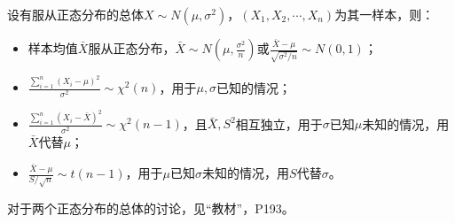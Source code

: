\begin{theorem}
设有服从正态分布的总体$X\sim N\left( \mu ,\sigma ^2 \right) $，$\left( X_1,X_2,\cdots ,X_n \right) $为其一样本，则：
\begin{itemize}
    \item 样本均值$\bar{X}$服从正态分布，$\bar{X}\sim N\left( \mu ,\frac{\sigma ^2}{n} \right) $或$\frac{\bar{X}-\mu}{\sqrt{\sigma ^2/n}}\sim N\left( 0,1 \right) $；
    \item $\frac{\sum_{i=1}^n{\left( X_i-\mu \right) ^2}}{\sigma ^2}\sim \chi ^2\left( n \right) $，用于$\mu ,\sigma $已知的情况；
    \item $\frac{\sum_{i=1}^n{\left( X_i-\bar{X} \right) ^2}}{\sigma ^2}\sim \chi ^2\left( n-1 \right) $，且$\bar{X},S^2$相互独立，用于$\sigma $已知$\mu $未知的情况，用$\bar{X}$代替$\mu $；
    \item $\frac{\bar{X}-\mu}{S/\sqrt{n}}\sim t\left( n-1 \right) $，用于$\mu $已知$\sigma $未知的情况，用$S$代替$\sigma $。
\end{itemize}
\end{theorem}

\begin{tcolorbox}
对于两个正态分布的总体的讨论，见“教材\cite{book1}”，P193。
\end{tcolorbox}




